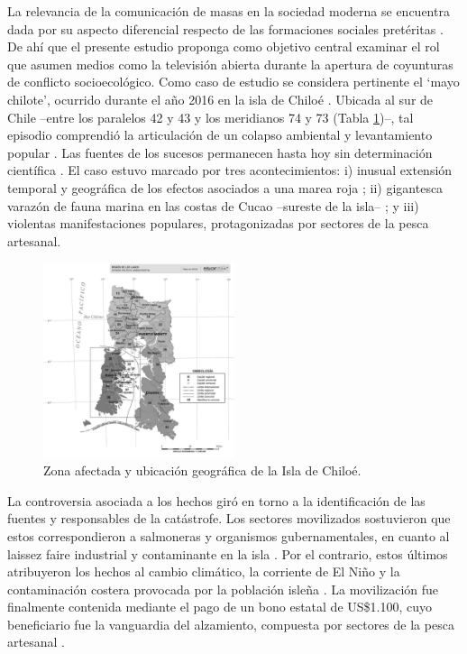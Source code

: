 \documentclass{textolivre}
\begin{document}
La relevancia de la comunicación de masas en la sociedad moderna se encuentra
dada por su aspecto diferencial respecto de las formaciones sociales pretéritas
\cite{Habermas2006}. De ahí que el presente estudio proponga como objetivo central
examinar el rol que asumen medios como la televisión abierta durante la apertura de
coyunturas de conflicto socioecológico. Como caso de estudio se considera pertinente el
‘mayo chilote’, ocurrido durante el año 2016 en la isla de Chiloé \cite{ValdebenitoAllendes2018}.
Ubicada al sur de Chile --entre los paralelos 42 y 43 y los meridianos 74 y 73 (Tabla \ref{fig01})--, 
tal episodio comprendió la articulación de un colapso ambiental y levantamiento
popular \cite{cabello2018,roman2016}. Las fuentes de los
sucesos permanecen hasta hoy sin determinación científica \cite{buschmann2016,t13b}. 
El caso estuvo marcado por tres acontecimientos: i) inusual extensión
temporal y geográfica de los efectos asociados a una marea roja \cite{burrows2016}; ii)
gigantesca varazón de fauna marina en las costas de Cucao --sureste de la isla-- \cite{cnnchile2016b}; 
y iii) violentas manifestaciones populares, protagonizadas por sectores de
la pesca artesanal.

\begin{figure}[htbp]
 \centering
 \includegraphics[width=0.5\textwidth]{figure001.pdf}
 \caption{Zona afectada y ubicación geográfica de la Isla de Chiloé.}
 \label{fig01}
\end{figure}

La controversia asociada a los hechos giró en torno a la identificación de las
fuentes y responsables de la catástrofe. Los sectores movilizados sostuvieron que estos
correspondieron a salmoneras y organismos gubernamentales, en cuanto al laissez faire
industrial y contaminante en la isla \cite{agenciaefe}. Por el contrario, estos últimos
atribuyeron los hechos al cambio climático, la corriente de El Niño y la contaminación
costera provocada por la población isleña \cite{infante2016,salmonexpert}. La
movilización fue finalmente contenida mediante el pago de un bono estatal de US\$1.100,
cuyo beneficiario fue la vanguardia del alzamiento, compuesta por sectores de la pesca
artesanal \cite{24horasb}.
\end{document}
